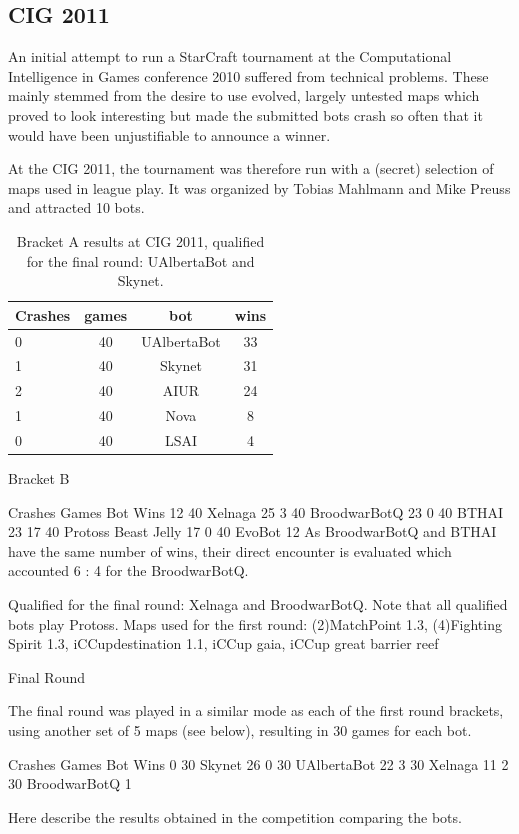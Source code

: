 \documentclass[journal]{IEEEtran}
\begin{document}
{\color{magenta}

\subsection{CIG 2011}
\label{sec:cig2011}

An initial attempt to run a StarCraft tournament at the Computational
Intelligence in Games conference 2010 suffered from technical problems.
These mainly stemmed from the desire to use evolved, largely untested
maps which proved to look interesting but made the submitted bots crash
so often that it would have been unjustifiable to announce a winner.

At the CIG 2011, the tournament was therefore run with a (secret) selection
of maps used in league play. It was organized by Tobias Mahlmann and Mike
Preuss and attracted 10 bots.

\begin{table}[htb]
\caption{Bracket A results at CIG 2011, 
qualified for the final round: UAlbertaBot and Skynet.}
\label{tab:correlations}
\begin{small}
\begin{center}
\begin{tabular}{|l|c|c|c|}
\hline
Crashes & games & bot	& wins\\ \hline
0 &	 40 &	 UAlbertaBot &	 33\\
1 &   40 &	 Skynet	  &  31\\
2 &	 40 &	 AIUR	  &  24\\
1 &	 40 &	 Nova	  &  8\\
0 &	 40 &	 LSAI	  &  4\\
\hline
\end{tabular}
\end{center}
\end{small}
\end{table}




Bracket B

Crashes	 Games	 Bot	 Wins
12	 40	 Xelnaga	 25
3	 40	 BroodwarBotQ	 23
0	 40	 BTHAI	 23
17	 40	 Protoss Beast Jelly	 17
0	 40	 EvoBot	 12
As BroodwarBotQ and BTHAI have the same number of wins, their direct encounter is evaluated which accounted 6 : 4 for the BroodwarBotQ.

Qualified for the final round: Xelnaga and BroodwarBotQ. Note that all qualified bots play Protoss.
Maps used for the first round: (2)MatchPoint 1.3, (4)Fighting Spirit 1.3, iCCupdestination 1.1, iCCup gaia, iCCup great barrier reef

Final Round

The final round was played in a similar mode as each of the first round brackets, using another set of 5 maps (see below), resulting in 30 games for each bot.

Crashes	 Games	 Bot	 Wins
0	 30	 Skynet	 26
0	 30	 UAlbertaBot	 22
3	 30	 Xelnaga	 11
2	 30	 BroodwarBotQ	 1


Here describe the results obtained in the competition comparing the bots.
}
\end{document}
